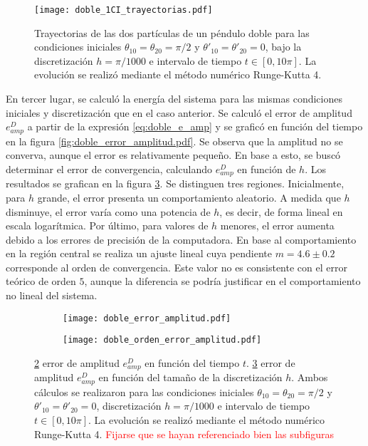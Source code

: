 \documentclass[aps,prb,twocolumn,superscriptaddress,floatfix,longbibliography,10pt]{revtex4-2}
\newcounter{para}
\begin{document}
\begin{figure}[h]
  \texttt{[image: doble\_1CI\_trayectorias.pdf]}
  \caption{Trayectorias de las dos partículas de un péndulo doble para las condiciones iniciales  $\theta_{1 0} = \theta_{2 0} = \pi/2$ y $\theta'_{1 0} = \theta'_{2 0} = 0$, bajo la discretización $h = \pi/1000$ e intervalo de tiempo $t \in [0, 10 \pi]$. La evolución se realizó mediante el método numérico Runge-Kutta 4.}
   \label{fig:doble_1CI_trayectorias}
\end{figure}

En tercer lugar, se calculó la energía del sistema para las mismas condiciones iniciales y discretización que en el caso anterior. Se calculó el error de amplitud $e_{amp}^D$ a partir de la expresión \ref{eq:doble_e_amp} y se graficó en función del tiempo en la figura \ref{fig:doble_error_amplitud.pdf}. Se observa que la amplitud no se converva, aunque el error es relativamente pequeño. En base a esto, se buscó determinar el error de convergencia, calculando $e_{amp}^D$ en función de $h$. Los resultados se grafican en la figura \ref{fig:doble_orden_error_amplitud}. Se distinguen tres regiones. Inicialmente, para $h$ grande,
el error presenta un comportamiento aleatorio. A medida que $h$ disminuye, el error varía como una potencia de $h$, es decir, de forma lineal en escala logarítmica. Por
último, para valores de $h$ menores, el error aumenta debido a los errores de precisión de la computadora. En base al comportamiento en la región central se realiza un ajuste lineal cuya pendiente $m = 4.6 \pm 0.2$ corresponde al orden de convergencia. Este valor no es consistente con el error teórico de orden $5$, aunque la diferencia se podría justificar en el comportamiento no lineal del sistema.



\begin{figure}
  \centering
  \begin{subfigure}[b]{0.45\textwidth}
      \centering
      \texttt{[image: doble\_error\_amplitud.pdf]}
      \caption{\label{fig:doble_error_amplitud}}
  \end{subfigure}
  \hfill
  \begin{subfigure}[b]{0.45\textwidth}
      \centering
      \texttt{[image: doble\_orden\_error\_amplitud.pdf]}
      \caption{\label{fig:doble_orden_error_amplitud}}
  \end{subfigure}
     \caption{\ref{fig:doble_error_amplitud} error de amplitud  $e_{amp}^D$ en función del tiempo $t$. \ref{fig:doble_orden_error_amplitud} error de amplitud  $e_{amp}^D$ en función del tamaño de la discretización $h$. Ambos cálculos se realizaron para las condiciones iniciales $\theta_{1 0} = \theta_{2 0} = \pi/2$ y $\theta'_{1 0} = \theta'_{2 0} = 0$, discretización $h = \pi/1000$ e intervalo de tiempo $t \in [0, 10 \pi]$. La evolución se realizó mediante el método numérico Runge-Kutta 4. \textcolor{red}{Fijarse que se hayan referenciado bien las subfiguras}}
     \label{fig:doble_e_amp}
\end{figure}
\end{document}

